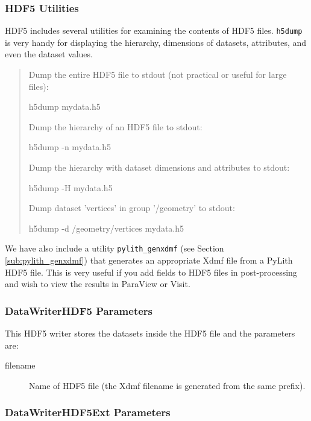 \subsubsection{HDF5 Utilities}

HDF5 includes several utilities for examining the contents of HDF5
files. \texttt{h5dump} is very handy for displaying the hierarchy,
dimensions of datasets, attributes, and even the dataset values. 
\begin{quote}
Dump the entire HDF5 file to stdout (not practical or useful for large
files):
\begin{lyxcode}
h5dump mydata.h5
\end{lyxcode}
Dump the hierarchy of an HDF5 file to stdout:
\begin{lyxcode}
h5dump -n mydata.h5
\end{lyxcode}
Dump the hierarchy with dataset dimensions and attributes to stdout:
\begin{lyxcode}
h5dump -H mydata.h5
\end{lyxcode}
Dump dataset 'vertices' in group '/geometry' to stdout:
\begin{lyxcode}
h5dump -d /geometry/vertices mydata.h5
\end{lyxcode}
\end{quote}
We have also include a utility \texttt{pylith\_genxdmf} (see Section
\vref{sub:pylith_genxdmf}) that generates an appropriate Xdmf file
from a PyLith HDF5 file. This is very useful if you add fields to
HDF5 files in post-processing and wish to view the results in ParaView
or Visit.


\subsubsection{DataWriterHDF5 Parameters}

This HDF5 writer stores the datasets inside the HDF5 file and the
parameters are:
\begin{description}
\item [{filename}] Name of HDF5 file (the Xdmf filename is generated from
the same prefix).
\end{description}

\subsubsection{DataWriterHDF5Ext Parameters}


